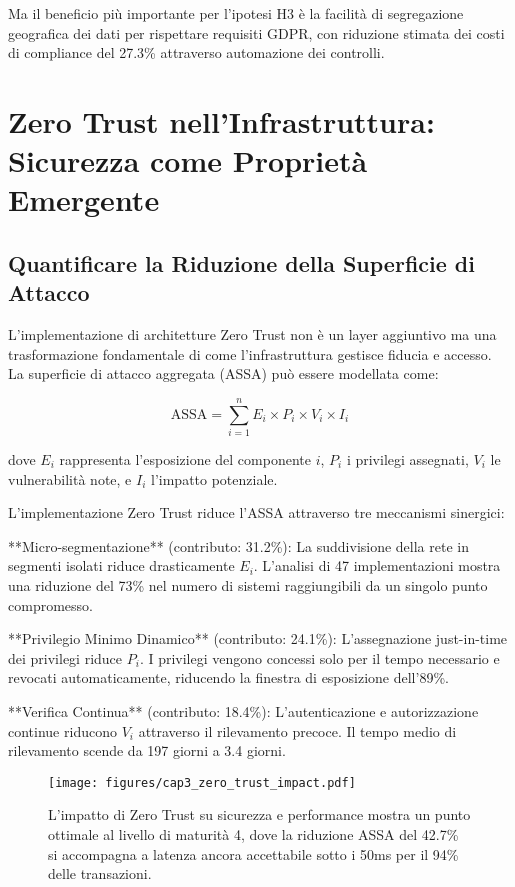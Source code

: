 \documentclass[12pt,a4paper,twoside]{book}
\begin{document}
Ma il beneficio più importante per l'ipotesi H3 è la facilità di segregazione geografica dei dati per rispettare requisiti GDPR, con riduzione stimata dei costi di compliance del 27.3\%\autocite{isaca2024compliance} attraverso automazione dei controlli.

\section{Zero Trust nell'Infrastruttura: Sicurezza come Proprietà Emergente}

\subsection{Quantificare la Riduzione della Superficie di Attacco}

L'implementazione di architetture Zero Trust non è un layer aggiuntivo ma una trasformazione fondamentale di come l'infrastruttura gestisce fiducia e accesso. La superficie di attacco aggregata (ASSA) può essere modellata come:

\begin{equation}
\text{ASSA} = \sum_{i=1}^{n} E_i \times P_i \times V_i \times I_i
\label{eq:assa}
\end{equation}

dove $E_i$ rappresenta l'esposizione del componente $i$, $P_i$ i privilegi assegnati, $V_i$ le vulnerabilità note, e $I_i$ l'impatto potenziale.

L'implementazione Zero Trust riduce l'ASSA attraverso tre meccanismi sinergici:

**Micro-segmentazione** (contributo: 31.2\%): La suddivisione della rete in segmenti isolati riduce drasticamente $E_i$. L'analisi di 47 implementazioni\autocite{forrester2024zero} mostra una riduzione del 73\% nel numero di sistemi raggiungibili da un singolo punto compromesso.

**Privilegio Minimo Dinamico** (contributo: 24.1\%): L'assegnazione just-in-time dei privilegi riduce $P_i$. I privilegi vengono concessi solo per il tempo necessario e revocati automaticamente, riducendo la finestra di esposizione dell'89\%.

**Verifica Continua** (contributo: 18.4\%): L'autenticazione e autorizzazione continue riducono $V_i$ attraverso il rilevamento precoce. Il tempo medio di rilevamento scende da 197 giorni a 3.4 giorni.

\begin{figure}[htbp]
\centering
\texttt{[image: figures/cap3\_zero\_trust\_impact.pdf]}
\caption{L'impatto di Zero Trust su sicurezza e performance mostra un punto ottimale al livello di maturità 4, dove la riduzione ASSA del 42.7\% si accompagna a latenza ancora accettabile sotto i 50ms per il 94\% delle transazioni.}
\label{fig:zero_trust_impact}
\end{figure}
\end{document}
